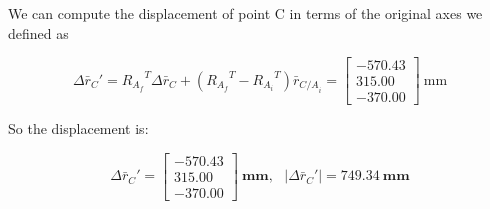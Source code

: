 \documentclass[12pt, letterpaper]{../assignment}
\begin{document}
We can compute the displacement of point C in terms of the original axes we defined as

$$ \Delta {\bar{r}_C}' = {R_{A_f}}^T \Delta \bar{r}_C  + \left( {R_{A_f}}^T - {R_{A_i}}^T \right)\bar{r}_{{C/A}_i} = 
\left[\begin{array}{r}  -570.43\\315.00 \\ -370.00 \end{array}\right] \ \text{mm} $$

So the displacement is:

\begin{answer}
$$ \Delta {\bar{r}_C}' =
\left[\begin{array}{r}  -570.43\\315.00 \\ -370.00 \end{array}\right] \ \textbf{mm}, \ \ \
\left|\Delta {\bar{r}_C}'\right| = 749.34 \ \textbf{mm} $$
\end{answer}



\end{document}
